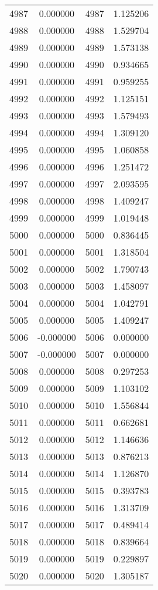\documentclass[12pt]{article}
\begin{document}
\begin{longtable}{@{}cccc@{}}
4987 & 0.000000 & 4987 & 1.125206 \\
4988 & 0.000000 & 4988 & 1.529704 \\
4989 & 0.000000 & 4989 & 1.573138 \\
4990 & 0.000000 & 4990 & 0.934665 \\
4991 & 0.000000 & 4991 & 0.959255 \\
4992 & 0.000000 & 4992 & 1.125151 \\
4993 & 0.000000 & 4993 & 1.579493 \\
4994 & 0.000000 & 4994 & 1.309120 \\
4995 & 0.000000 & 4995 & 1.060858 \\
4996 & 0.000000 & 4996 & 1.251472 \\
4997 & 0.000000 & 4997 & 2.093595 \\
4998 & 0.000000 & 4998 & 1.409247 \\
4999 & 0.000000 & 4999 & 1.019448 \\
5000 & 0.000000 & 5000 & 0.836445 \\
5001 & 0.000000 & 5001 & 1.318504 \\
5002 & 0.000000 & 5002 & 1.790743 \\
5003 & 0.000000 & 5003 & 1.458097 \\
5004 & 0.000000 & 5004 & 1.042791 \\
5005 & 0.000000 & 5005 & 1.409247 \\
5006 & -0.000000 & 5006 & 0.000000 \\
5007 & -0.000000 & 5007 & 0.000000 \\
5008 & 0.000000 & 5008 & 0.297253 \\
5009 & 0.000000 & 5009 & 1.103102 \\
5010 & 0.000000 & 5010 & 1.556844 \\
5011 & 0.000000 & 5011 & 0.662681 \\
5012 & 0.000000 & 5012 & 1.146636 \\
5013 & 0.000000 & 5013 & 0.876213 \\
5014 & 0.000000 & 5014 & 1.126870 \\
5015 & 0.000000 & 5015 & 0.393783 \\
5016 & 0.000000 & 5016 & 1.313709 \\
5017 & 0.000000 & 5017 & 0.489414 \\
5018 & 0.000000 & 5018 & 0.839664 \\
5019 & 0.000000 & 5019 & 0.229897 \\
5020 & 0.000000 & 5020 & 1.305187 \\

\end{longtable}
\end{document}
